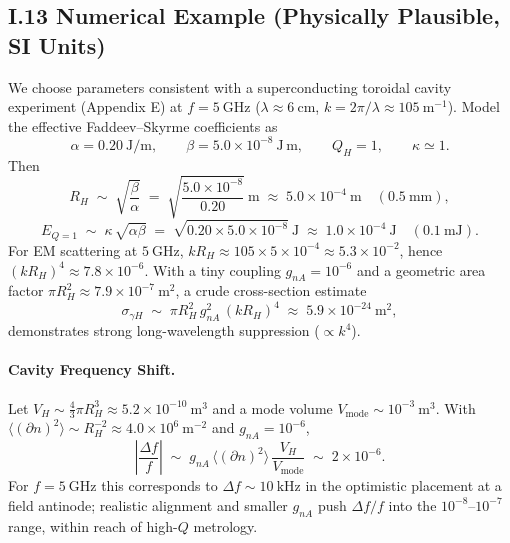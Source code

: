 \subsection*{I.13 Numerical Example (Physically Plausible, SI Units)}
We choose parameters consistent with a superconducting toroidal cavity experiment (Appendix E) at $f\!=\!5~\mathrm{GHz}$ ($\lambda\!\approx\!6~\mathrm{cm}$, $k\!=\!2\pi/\lambda\!\approx\!105~\mathrm{m^{-1}}$). 
Model the effective Faddeev--Skyrme coefficients as
\begin{equation}
\alpha = 0.20~\mathrm{J/m},\qquad \beta = 5.0\times 10^{-8}~\mathrm{J\,m},\qquad Q_H=1,\qquad \kappa\simeq 1.
\end{equation}
Then
\begin{equation}
R_H \;\sim\; \sqrt{\frac{\beta}{\alpha}} \;=\; \sqrt{\frac{5.0\times 10^{-8}}{0.20}}~\mathrm{m} \;\approx\; 5.0\times 10^{-4}~\mathrm{m}\quad (0.5~\mathrm{mm}),
\end{equation}
\begin{equation}
E_{Q=1} \;\sim\; \kappa\,\sqrt{\alpha\beta} \;=\; \sqrt{0.20\times 5.0\times 10^{-8}}~\mathrm{J} \;\approx\; 1.0\times 10^{-4}~\mathrm{J}\quad (0.1~\mathrm{mJ}).
\end{equation}
For EM scattering at $5~\mathrm{GHz}$, $kR_H \approx 105 \times 5\times 10^{-4} \approx 5.3\times 10^{-2}$, hence $(kR_H)^4 \approx 7.8\times 10^{-6}$. 
With a tiny coupling $g_{nA}=10^{-6}$ and a geometric area factor $\pi R_H^2 \approx 7.9\times 10^{-7}~\mathrm{m^2}$, a crude cross-section estimate
\begin{equation}
\sigma_{\gamma H} \;\sim\; \pi R_H^2 \, g_{nA}^2 \, (kR_H)^4 \;\approx\; 5.9\times 10^{-24}~\mathrm{m^2},
\end{equation}
demonstrates strong long-wavelength suppression ($\propto k^4$).

\paragraph{Cavity Frequency Shift.}
Let $V_H \sim \tfrac{4}{3}\pi R_H^3 \approx 5.2\times 10^{-10}~\mathrm{m^3}$ and a mode volume $V_{\mathrm{mode}}\sim 10^{-3}~\mathrm{m^3}$.
With $\langle (\partial n)^2\rangle \sim R_H^{-2} \approx 4.0\times 10^6~\mathrm{m^{-2}}$ and $g_{nA}=10^{-6}$,
\begin{equation}
\left|\frac{\Delta f}{f}\right| \;\sim\; g_{nA}\,\langle (\partial n)^2\rangle\,\frac{V_H}{V_{\mathrm{mode}}} \;\sim\; 2\times 10^{-6}.
\end{equation}
For $f=5~\mathrm{GHz}$ this corresponds to $\Delta f \sim 10~\mathrm{kHz}$ in the optimistic placement at a field antinode; realistic alignment and smaller $g_{nA}$ push $\Delta f/f$ into the $10^{-8}$--$10^{-7}$ range, within reach of high-$Q$ metrology.

